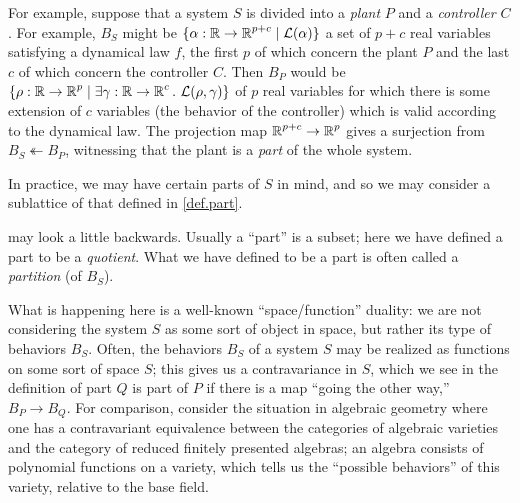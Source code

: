 For example, suppose that a system $S$ is divided into a \emph{plant} $P$ and a
\emph{controller} $C$. For example, $B_S$ might be $\{\alpha : \operatorname{\mathbb{R}} \to \operatorname{\mathbb{R}}^{p + c}
\mid \operatorname{\mathcal{L}}(\alpha)\}$ a set of $p + c$ real variables satisfying a dynamical law $f$,
the first $p$ of which concern the plant $P$ and the last $c$ of which concern
the controller $C$. Then $B_P$ would be $\{\rho : \operatorname{\mathbb{R}} \to \operatorname{\mathbb{R}}^{p} \mid \exists
\gamma : \operatorname{\mathbb{R}} \to \operatorname{\mathbb{R}}^{c}.\, \operatorname{\mathcal{L}}(\rho, \gamma)\}$ of $p$ real variables for which
there is some extension of $c$ variables (the behavior of the controller) which
is valid according to the dynamical law. The projection map $\operatorname{\mathbb{R}}^{p + c} \to
\operatorname{\mathbb{R}}^p$ gives a surjection from $B_S \twoheadleftarrow B_P$, witnessing that the
plant is a \emph{part} of the whole system.

In practice, we may have certain parts of $S$ in mind, and so we may consider a sublattice of that defined in \cref{def.part}. 

\begin{rmk}
 may look a little backwards. Usually a ``part'' is a subset; here we have defined a part to be a \emph{quotient}. What we have defined to be a part is often called a \emph{partition} (of $B_S$). 

What is happening here is a well-known ``space/function'' duality: we are not considering the system $S$ as some sort of object in space, but rather its type of behaviors $B_S$. Often, the behaviors $B_S$ of a system $S$ may be realized as functions on some sort of space $S$; this gives us a contravariance in $S$, which we see in the definition of part $Q$ is part of $P$ if there is a map ``going the other way,'' $B_P\to B_Q$. For comparison, consider the situation in algebraic geometry where one has a contravariant equivalence between the categories of algebraic varieties and the category of reduced finitely presented algebras; an algebra consists of polynomial functions on a variety, which tells us the ``possible behaviors'' of this variety, relative to the base field.
\end{rmk}


